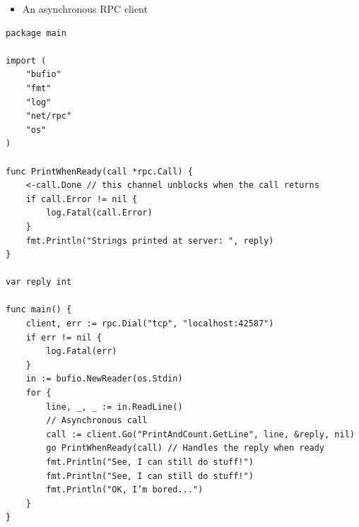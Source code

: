 \documentclass[11pt]{article}
\begin{document}
\begin{itemize}
\item An asynchronous RPC client
\end{itemize}
\begin{verbatim}
package main

import (
	"bufio"
	"fmt"
	"log"
	"net/rpc"
	"os"
)

func PrintWhenReady(call *rpc.Call) {
	<-call.Done // this channel unblocks when the call returns
	if call.Error != nil {
		log.Fatal(call.Error)
	}
	fmt.Println("Strings printed at server: ", reply)
}

var reply int

func main() {
	client, err := rpc.Dial("tcp", "localhost:42587")
	if err != nil {
		log.Fatal(err)
	}
	in := bufio.NewReader(os.Stdin)
	for {
		line, _, _ := in.ReadLine()
		// Asynchronous call
		call := client.Go("PrintAndCount.GetLine", line, &reply, nil)
		go PrintWhenReady(call) // Handles the reply when ready
		fmt.Println("See, I can still do stuff!")
		fmt.Println("See, I can still do stuff!")
		fmt.Println("OK, I’m bored...")
	}
}
\end{verbatim}
\end{document}
